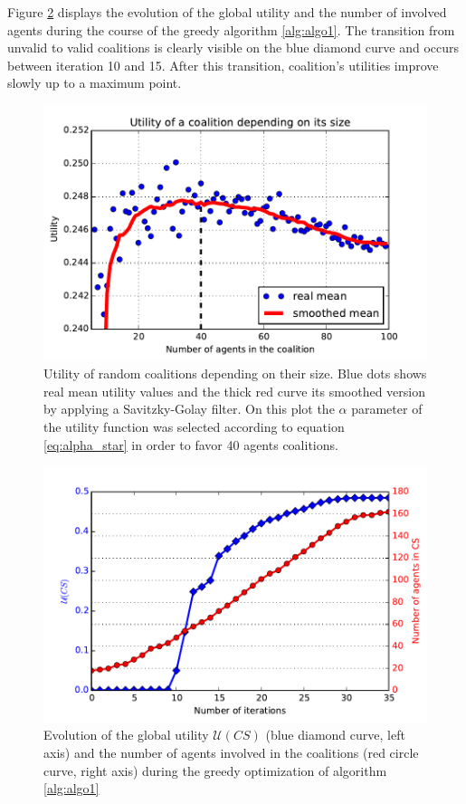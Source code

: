 \documentclass[conference]{IEEEtran}
\begin{document}
Figure \ref{fig:search} displays the evolution of the global utility and the number of involved agents during the course of the greedy algorithm \ref{alg:algo1}. The transition from unvalid to valid coalitions is clearly visible on the blue diamond curve and occurs between iteration 10 and 15. After this transition, coalition's utilities improve slowly up to a maximum point. 

\begin{figure}
\includegraphics[scale=.6]{real_utility_2}
\caption{Utility of random coalitions depending on their size. Blue dots shows real mean utility values and the thick red curve its smoothed version by applying a Savitzky-Golay filter. On this plot the $ \alpha $ parameter of the utility function was selected according to equation \ref{eq:alpha_star} in order to favor 40 agents coalitions.}
\label{fig:real_utility2}
\end{figure}

\begin{figure}
\includegraphics[scale=.6]{search}
\caption{Evolution of the global utility $ \mathcal{U}(CS) $ (blue diamond curve, left axis) and the number of agents involved in the coalitions (red circle curve, right axis) during the greedy optimization of algorithm \ref{alg:algo1} }
\label{fig:search}
\end{figure}
\end{document}
